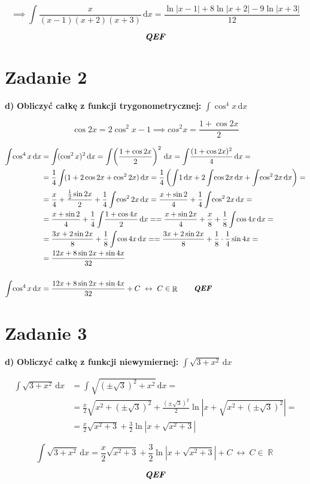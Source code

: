 \documentclass[12pt]{article}
\newcommand{\ex}[1]{\textbf{ #1)}}
\newcommand{\for}{\ \leftrightarrow\ }
\newcommand{\Integral}[2]{\int \! #1 \, \mathrm{d}#2}
\newcommand{\qef}{\textbf{\textit{QEF}}}
\newcommand{\task}[1]{\section*{Zadanie #1}}
\DeclareMathOperator{\R}{\mathbb{R}}
\begin{document}
\begin{equation*}
    \implies \Integral{\frac{x}{(x-1)(x+2)(x+3)}}{x} =
    \frac{\ln{|x-1|} + 8 \ln{|x+2|} - 9 \ln{|x+3|}}{12}
\end{equation*}

$$\qef$$


\newpage

\setcounter{equation}{0}
\task{2}\ex{d}
\textbf{Obliczyć całkę z funkcji trygonometrycznej: }
$ \displaystyle \Integral{\cos^4{x}}{x} $

$$ \cos{2x} = 2 \cos^2{x} - 1 \implies cos^2{x} = \frac{1 + \cos{2x}}{2} $$

\begin{equation*}
    \begin{aligned}
        \Integral{\cos^4{x}}{x} &
        = \Integral{(\cos^2{x})^2}{x}
        = \Integral{\left(\frac{1 + \cos{2x}}{2}\right)^2}{x}
        = \Integral{\frac{(1 + \cos{2x})^2}{4}}{x} =\\
        &= \frac{1}{4} \Integral{(1 + 2\cos{2x} + \cos^2{2x})}{x}
        = \frac{1}{4} \left( \Integral{1}{x} + 2\Integral{\cos{2x}}{x} + \Integral{\cos^2{2x}}{x} \right) =\\
        &= \frac{x}{4} + \frac{\frac{1}{2} \sin{2x}}{2} + \frac{1}{4}\Integral{\cos^2{2x}}{x}
        = \frac{x + \sin{2}}{4} + \frac{1}{4}\Integral{\cos^2{2x}}{x} =\\
        &= \frac{x + \sin{2}}{4} + \frac{1}{4}\Integral{\frac{1 + \cos{4x}}{2}}{x} =
        = \frac{x + \sin{2x}}{4} + \frac{x}{8} + \frac{1}{8}\Integral{\cos{4x}}{x} =\\
        &= \frac{3x + 2\sin{2x}}{8} + \frac{1}{8}\Integral{\cos{4x}}{x} =
        = \frac{3x + 2\sin{2x}}{8} + \frac{1}{8} \cdot \frac{1}{4} \sin{4x} =\\
        &= \frac{12x + 8\sin{2x} + \sin{4x}}{32}
        \\ \\
        \Integral{\cos^4{x}}{x} &= \frac{12x + 8\sin{2x} + \sin{4x}}{32} + C \for C \in \R \qquad \qef
    \end{aligned}
\end{equation*}


\setcounter{equation}{0}
\task{3}\ex{d}
\textbf{Obliczyć całkę z funkcji niewymiernej: }
$ \displaystyle \Integral{\sqrt{3+x^2}}{x} $

\begin{equation*}
    \begin{aligned}
        \Integral{\sqrt{3+x^2}}{x} &= \Integral{\sqrt{(\pm\sqrt{3})^2+x^2}}{x} =\\
        &= \frac{x}{2}\sqrt{x^2 + (\pm\sqrt{3})^2} + \frac{(\pm\sqrt{3})^2}{2} \ln{\left| x + \sqrt{x^2 + (\pm\sqrt{3})^2}\right|} =\\
        &= \frac{x}{2}\sqrt{x^2 + 3} + \frac{3}{2} \ln{\left| x + \sqrt{x^2 + 3}\right|}
    \end{aligned}
\end{equation*}

\begin{equation*}
        \Integral{\sqrt{3+x^2}}{x} = \frac{x}{2}\sqrt{x^2 + 3} + \frac{3}{2} \ln{\left| x + \sqrt{x^2 + 3}\right|} + C \for C \in \R
\end{equation*}

$$ \qef $$
\end{document}
